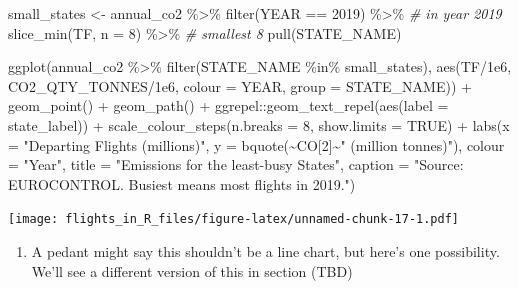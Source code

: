 \documentclass[
]{book}
\newenvironment{Shaded}{\begin{snugshade}}{\end{snugshade}}
\newcommand{\AttributeTok}[1]{\textcolor[rgb]{0.77,0.63,0.00}{#1}}
\newcommand{\CommentTok}[1]{\textcolor[rgb]{0.56,0.35,0.01}{\textit{#1}}}
\newcommand{\ConstantTok}[1]{\textcolor[rgb]{0.00,0.00,0.00}{#1}}
\newcommand{\DecValTok}[1]{\textcolor[rgb]{0.00,0.00,0.81}{#1}}
\newcommand{\FloatTok}[1]{\textcolor[rgb]{0.00,0.00,0.81}{#1}}
\newcommand{\FunctionTok}[1]{\textcolor[rgb]{0.00,0.00,0.00}{#1}}
\newcommand{\NormalTok}[1]{#1}
\newcommand{\OtherTok}[1]{\textcolor[rgb]{0.56,0.35,0.01}{#1}}
\newcommand{\SpecialCharTok}[1]{\textcolor[rgb]{0.00,0.00,0.00}{#1}}
\newcommand{\StringTok}[1]{\textcolor[rgb]{0.31,0.60,0.02}{#1}}
\providecommand{\tightlist}{%
  \setlength{\itemsep}{0pt}\setlength{\parskip}{0pt}}
\begin{document}
\begin{Shaded}
\begin{Highlighting}[]
\NormalTok{small\_states }\OtherTok{\textless{}{-}}\NormalTok{ annual\_co2 }\SpecialCharTok{\%\textgreater{}\%} 
  \FunctionTok{filter}\NormalTok{(YEAR }\SpecialCharTok{==} \DecValTok{2019}\NormalTok{) }\SpecialCharTok{\%\textgreater{}\%}     \CommentTok{\#  in year 2019}
  \FunctionTok{slice\_min}\NormalTok{(TF, }\AttributeTok{n =} \DecValTok{8}\NormalTok{) }\SpecialCharTok{\%\textgreater{}\%}  \CommentTok{\# smallest 8 }
  \FunctionTok{pull}\NormalTok{(STATE\_NAME)}

\FunctionTok{ggplot}\NormalTok{(annual\_co2 }\SpecialCharTok{\%\textgreater{}\%} 
         \FunctionTok{filter}\NormalTok{(STATE\_NAME }\SpecialCharTok{\%in\%}\NormalTok{ small\_states), }
       \FunctionTok{aes}\NormalTok{(TF}\SpecialCharTok{/}\FloatTok{1e6}\NormalTok{, CO2\_QTY\_TONNES}\SpecialCharTok{/}\FloatTok{1e6}\NormalTok{, }
           \AttributeTok{colour =}\NormalTok{ YEAR, }\AttributeTok{group =}\NormalTok{ STATE\_NAME)) }\SpecialCharTok{+}
  \FunctionTok{geom\_point}\NormalTok{() }\SpecialCharTok{+} 
  \FunctionTok{geom\_path}\NormalTok{() }\SpecialCharTok{+}
\NormalTok{  ggrepel}\SpecialCharTok{::}\FunctionTok{geom\_text\_repel}\NormalTok{(}\FunctionTok{aes}\NormalTok{(}\AttributeTok{label =}\NormalTok{ state\_label)) }\SpecialCharTok{+}
  \FunctionTok{scale\_colour\_steps}\NormalTok{(}\AttributeTok{n.breaks =} \DecValTok{8}\NormalTok{, }\AttributeTok{show.limits =} \ConstantTok{TRUE}\NormalTok{) }\SpecialCharTok{+}
  \FunctionTok{labs}\NormalTok{(}\AttributeTok{x =} \StringTok{"Departing Flights (millions)"}\NormalTok{, }
       \AttributeTok{y =} \FunctionTok{bquote}\NormalTok{(}\SpecialCharTok{\textasciitilde{}}\NormalTok{CO[}\DecValTok{2}\NormalTok{]}\SpecialCharTok{\textasciitilde{}}\StringTok{" (million tonnes)"}\NormalTok{),}
       \AttributeTok{colour =} \StringTok{"Year"}\NormalTok{,}
       \AttributeTok{title =} \StringTok{"Emissions for the least{-}busy States"}\NormalTok{,}
       \AttributeTok{caption =} \StringTok{"Source: EUROCONTROL. \textquotesingle{}Busiest\textquotesingle{} means most flights in 2019."}\NormalTok{)}
\end{Highlighting}
\end{Shaded}

\texttt{[image: flights\_in\_R\_files/figure-latex/unnamed-chunk-17-1.pdf]}

\begin{enumerate}
\def\labelenumi{\arabic{enumi})}
\setcounter{enumi}{3}
\tightlist
\item
  A pedant might say this shouldn't be a line chart, but here's one possibility. We'll see a different version of this in section (TBD)
\end{enumerate}
\end{document}
